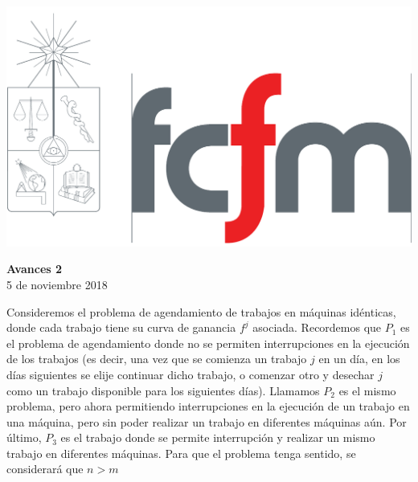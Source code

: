\documentclass[10pt]{article}
\theoremstyle{plain}
\theoremstyle{definition}
\newcommand{\sca}{Escriba Uno}
\newcommand{\scb}{Escriba Dos}
\newcommand{\scc}{Escriba Tres}
\newcommand{\fecha}{5 de noviembre 2018 }
\begin{document}
\vspace*{-1.2 cm}
\begin{flushleft}
\includegraphics[scale=0.15]{fcfm}
\end{flushleft}
\bigskip




\begin{center}
\LARGE\textbf{Avances 2}\\
\fecha
\end{center}
\bigskip

Consideremos el problema de agendamiento de trabajos en máquinas idénticas, donde cada trabajo tiene su curva de ganancia $f^j$ asociada. Recordemos que $P_1$ es el problema de agendamiento donde no se permiten interrupciones en la ejecución de los trabajos (es decir, una vez que se comienza un trabajo $j$ en un día, en los días siguientes se elije continuar dicho trabajo, o comenzar otro y desechar $j$ como un trabajo disponible para los siguientes días). Llamamos $P_2$ es el mismo problema, pero ahora permitiendo interrupciones en la ejecución de un trabajo en una máquina, pero sin poder realizar un trabajo en diferentes máquinas aún. Por último, $P_3$ es el trabajo donde se permite interrupción y realizar un mismo trabajo en diferentes máquinas. Para que el problema tenga sentido, se considerará que $n > m$\\~\\
\end{document}
